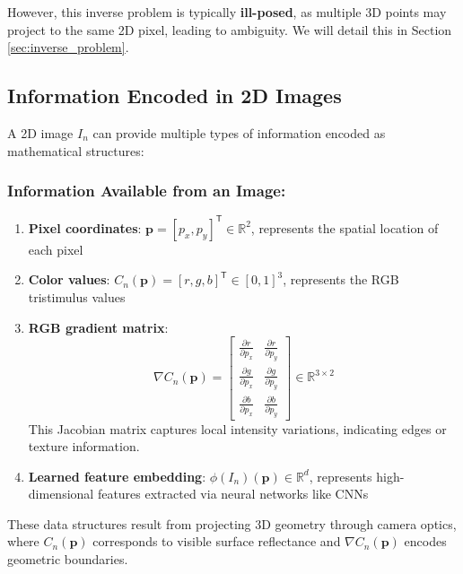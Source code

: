 \documentclass[12pt]{article}
\newcommand{\R}{\mathbb{R}}
\newcommand{\vect}[1]{\bm{#1}}
\theoremstyle{definition}
\begin{document}
However, this inverse problem is typically \textbf{ill-posed}, as multiple 3D points may project to the same 2D pixel, leading to ambiguity. We will detail this in Section \ref{sec:inverse_problem}.

\subsection{Information Encoded in 2D Images} \label{sec:image_info}

A 2D image $I_n$ can provide multiple types of information encoded as mathematical structures:

\subsubsection*{Information Available from an Image:}
\begin{enumerate}[label=(\roman*)]
    \item \textbf{Pixel coordinates}: $\vect{p} = [p_x, p_y]^\mathsf{T} \in \R^2$, represents the spatial location of each pixel
    
    \item \textbf{Color values}: $C_n(\vect{p}) = [r, g, b]^\mathsf{T} \in [0,1]^3$, represents the RGB tristimulus values
    
    \item \textbf{RGB gradient matrix}:
    \begin{equation}
        \nabla C_n(\vect{p}) = \begin{bmatrix}
            \frac{\partial r}{\partial p_x} & \frac{\partial r}{\partial p_y} \\[0.5em]
            \frac{\partial g}{\partial p_x} & \frac{\partial g}{\partial p_y} \\[0.5em]
            \frac{\partial b}{\partial p_x} & \frac{\partial b}{\partial p_y}
        \end{bmatrix} \in \R^{3 \times 2} \label{eq:gradient}
    \end{equation}
    This Jacobian matrix captures local intensity variations, indicating edges or texture information.
    
    \item \textbf{Learned feature embedding}: $\phi(I_n)(\vect{p}) \in \R^d$, represents high-dimensional features extracted via neural networks like CNNs
\end{enumerate}

These data structures result from projecting 3D geometry through camera optics, where $C_n(\vect{p})$ corresponds to visible surface reflectance and $\nabla C_n(\vect{p})$ encodes geometric boundaries.
\end{document}
